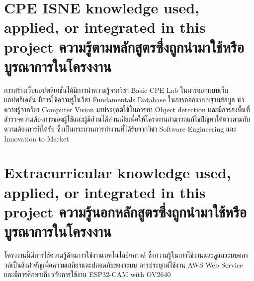 \section{\ifenglish%
\ifcpe CPE \else ISNE \fi knowledge used, applied, or integrated in this project
\else%
ความรู้ตามหลักสูตรซึ่งถูกนำมาใช้หรือบูรณาการในโครงงาน
\fi
}
การสร้างเว็บแอปพลิเคชันได้มีการนำความรู้จากวิชา Basic CPE Lab ในการออกแบบเว็บแอปพลิเคชัน มีการใช้ความรู้ในวิชา Fundamentals Database
ในการออกแบบบฐานข้อมูล นำความรู้จากวิชา Computer Vision มาประยุกต์ใช้ในการทำ Object detection 
และมีการลงพื้นที่สำรวจความต้องการของผู้ใช้และผู้มีส่วนได้ส่วนเสียเพื่อให้โครงงานสามารถแก้ไขปัญหาได้ตรงตามกับความต้องการที่ได้รับ 
ซึ่งเป็นกระบวนการทำงานที่ได้รับจากวิชา Software Engineering และ Innovation to Market

\section{\ifenglish%
Extracurricular knowledge used, applied, or integrated in this project
\else%
ความรู้นอกหลักสูตรซึ่งถูกนำมาใช้หรือบูรณาการในโครงงาน
\fi
}
โครงงานนี้มีการใช้ความรู้ด้านการใช้งานเทคโนโลยีคลาวด์ ซึ่งความรู้ในการใช้งานและดูแลระบบคลาวด์เป็นสิ่งสำคัญเพื่อความเสถียรและปลอดภัยของระบบ การประยุกต์ใช้งาน AWS Web Service และมีการศึกษาเกี่ยวกับการใช้งาน ESP32-CAM with OV2640
